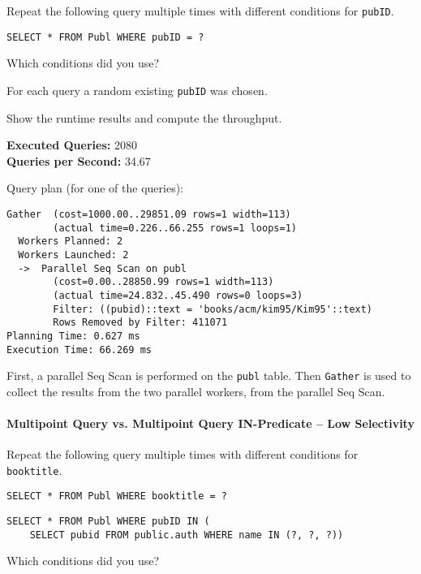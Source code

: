 \documentclass[11pt]{scrartcl}
\begin{document}
Repeat the following query multiple times with different conditions for \texttt{pubID}.

\begin{lstlisting}[style=dbtsql]
SELECT * FROM Publ WHERE pubID = ?
\end{lstlisting}

Which conditions did you use?

For each query a random existing \texttt{pubID} was chosen.

Show the runtime results and compute the throughput.

\textbf{Executed Queries: } 2080\\
\textbf{Queries per Second: } 34.67

Query plan (for one of the queries):

{\small
\parskip0pt\begin{verbatim}
Gather  (cost=1000.00..29851.09 rows=1 width=113)
        (actual time=0.226..66.255 rows=1 loops=1)
  Workers Planned: 2
  Workers Launched: 2
  ->  Parallel Seq Scan on publ
        (cost=0.00..28850.99 rows=1 width=113)
        (actual time=24.832..45.490 rows=0 loops=3)
        Filter: ((pubid)::text = 'books/acm/kim95/Kim95'::text)
        Rows Removed by Filter: 411071
Planning Time: 0.627 ms
Execution Time: 66.269 ms
\end{verbatim}}

First, a parallel Seq Scan is performed on the \texttt{publ} table.
Then \texttt{Gather} is used to collect the results from the two parallel workers, from the parallel Seq Scan.
\cite{ParallelQueryDocumentation2024}

\paragraph{Multipoint Query vs. Multipoint Query IN-Predicate -- Low Selectivity}

Repeat the following query multiple times with different conditions for \texttt{booktitle}.

\begin{lstlisting}[style=dbtsql]
SELECT * FROM Publ WHERE booktitle = ?
\end{lstlisting}

\begin{lstlisting}[style=dbtsql]
SELECT * FROM Publ WHERE pubID IN (
    SELECT pubid FROM public.auth WHERE name IN (?, ?, ?))
\end{lstlisting}

Which conditions did you use?
\end{document}
